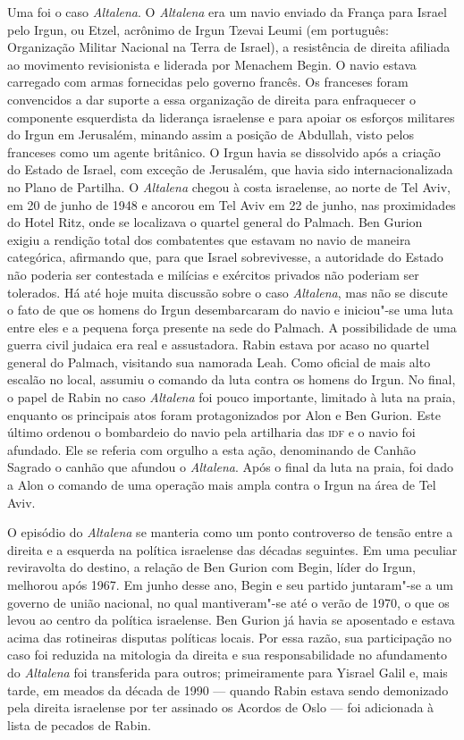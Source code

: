 Uma foi o caso \emph{Altalena}. O \emph{Altalena} era um navio enviado
da França para Israel pelo Irgun, ou Etzel, acrônimo de Irgun Tzevai
Leumi (em português: Organização Militar Nacional na Terra de Israel), 
a resistência de direita afiliada ao movimento revisionista e
liderada por Menachem Begin. O navio estava carregado com armas
fornecidas pelo governo francês. Os franceses foram convencidos a dar suporte a
essa organização de direita para enfraquecer o componente esquerdista da
liderança israelense e para apoiar os esforços militares do Irgun em
Jerusalém, minando assim a posição de Abdullah, visto pelos franceses
como um agente britânico. O Irgun havia se dissolvido após a criação do
Estado de Israel, com exceção de Jerusalém, que havia sido
internacionalizada no Plano de Partilha. O \emph{Altalena} chegou à
costa israelense, ao norte de Tel Aviv, em 20 de junho de 1948 e ancorou em Tel
Aviv em 22 de junho, nas proximidades do Hotel Ritz, onde se localizava o quartel
general do Palmach. Ben Gurion exigiu a rendição total dos combatentes
que estavam no navio de maneira categórica, afirmando que, para que Israel
sobrevivesse, a autoridade do Estado não poderia ser contestada e
milícias e exércitos privados não poderiam ser tolerados. Há até hoje
muita discussão sobre o caso \emph{Altalena}, mas não se discute o fato
de que os homens do Irgun desembarcaram do navio e iniciou"-se uma luta
entre eles e a pequena força presente na sede do Palmach. A
possibilidade de uma guerra civil judaica era real e assustadora. Rabin
estava por acaso no quartel general do Palmach, visitando sua namorada
Leah. Como oficial de mais alto escalão no local, assumiu o comando da
luta contra os homens do Irgun. No final, o papel de Rabin no caso
\emph{Altalena} foi pouco importante, limitado à luta na praia, enquanto
os principais atos foram protagonizados por Alon e Ben Gurion. Este último
ordenou o bombardeio do navio pela artilharia das \textsc{idf} e o navio foi
afundado. Ele se referia com orgulho a esta ação, denominando de Canhão
Sagrado o canhão que afundou o \emph{Altalena}. Após o final da luta na
praia, foi dado a Alon o comando de uma operação mais ampla contra o
Irgun na área de Tel Aviv.

O episódio do \emph{Altalena} se manteria como um ponto controverso de
tensão entre a direita e a esquerda na política israelense das décadas
seguintes. Em uma peculiar reviravolta do destino, a relação de Ben
Gurion com Begin, líder do Irgun, melhorou após 1967. Em junho desse ano,
Begin e seu partido juntaram"-se a um governo de união nacional, no qual
mantiveram"-se até o verão de 1970, o que os levou ao centro da
política israelense. Ben Gurion já havia se aposentado e estava acima
das rotineiras disputas políticas locais. Por essa razão, sua
participação no caso foi reduzida na mitologia da direita
e sua responsabilidade no afundamento do \emph{Altalena} foi transferida
para outros; primeiramente para Yisrael Galil e, mais tarde, em meados da
década de 1990 --- quando Rabin estava sendo demonizado pela direita
israelense por ter assinado os Acordos de Oslo --- foi adicionada à lista
de pecados de Rabin.

